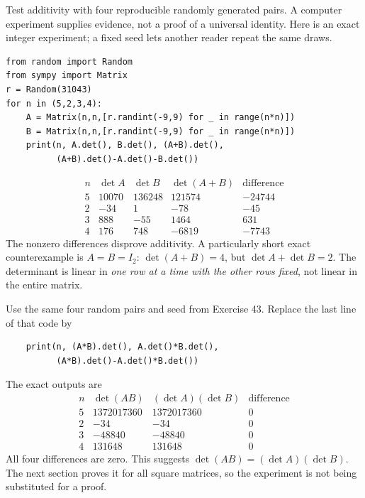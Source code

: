 \goal Test additivity with four reproducible randomly generated pairs.
A computer experiment supplies evidence, not a proof of a universal identity. Here is an exact integer experiment; a fixed seed lets another reader repeat the same draws.
\begin{verbatim}
from random import Random
from sympy import Matrix
r = Random(31043)
for n in (5,2,3,4):
    A = Matrix(n,n,[r.randint(-9,9) for _ in range(n*n)])
    B = Matrix(n,n,[r.randint(-9,9) for _ in range(n*n)])
    print(n, A.det(), B.det(), (A+B).det(),
          (A+B).det()-A.det()-B.det())
\end{verbatim}
\[\begin{array}{r|rrrr}n&\det A&\det B&\det(A+B)&\text{difference}\\\hline
5&10070&136248&121574&-24744\\
2&-34&1&-78&-45\\
3&888&-55&1464&631\\
4&176&748&-6819&-7743
\end{array}\]
The nonzero differences disprove additivity. A particularly short exact counterexample is $A=B=I_2$: $\det(A+B)=4$, but $\det A+\det B=2$. The determinant is linear in \emph{one row at a time with the other rows fixed}, not linear in the entire matrix.

Use the same four random pairs and seed from Exercise 43. Replace the last line of that code by
\begin{verbatim}
    print(n, (A*B).det(), A.det()*B.det(),
          (A*B).det()-A.det()*B.det())
\end{verbatim}
The exact outputs are
\[\begin{array}{r|rrr}n&\det(AB)&(\det A)(\det B)&\text{difference}\\\hline
5&1372017360&1372017360&0\\
2&-34&-34&0\\
3&-48840&-48840&0\\
4&131648&131648&0\end{array}\]
All four differences are zero. This suggests $\det(AB)=(\det A)(\det B)$. The next section proves it for all square matrices, so the experiment is not being substituted for a proof.

